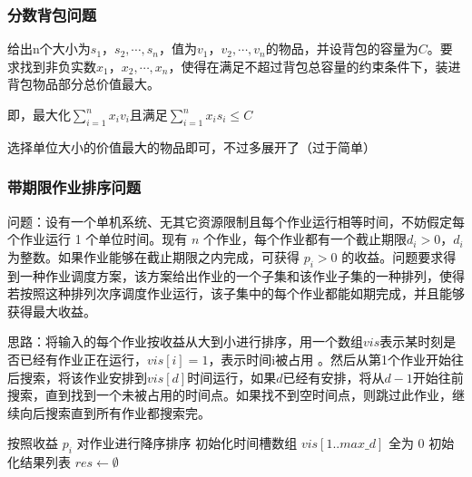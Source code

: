 \documentclass[./../main.tex]{subfiles}
\begin{document}
\subsubsection{分数背包问题}
给出n个大小为$s_{1}$，$s_{2},\cdots,s_{n}$，值为$v_{1}$，$v_{2},\cdots,v_{n}$的物品，并设背包的容量为$C$。要求找到非负实数$x_{1}$，$x_{2},\cdots,x_{n}$，使得在满足不超过背包总容量的约束条件下，装进背包物品部分总价值最大。

即，最大化$\sum_{i=1}^{n}x_{i}v_{i}$且满足$\sum_{i=1}^{n}x_{i}s_{i}\leq C$

选择单位大小的价值最大的物品即可，不过多展开了（过于简单）

\subsubsection{带期限作业排序问题}
问题：设有一个单机系统、无其它资源限制且每个作业运行相等时间，不妨假定每个作业运行 1 个单位时间。现有 $n$ 个作业，每个作业都有一个截止期限$d_i>0$，$d_i$ 为整数。如果作业能够在截止期限之内完成，可获得 $p_i>0$ 的收益。问题要求得到一种作业调度方案，该方案给出作业的一个子集和该作业子集的一种排列，使得若按照这种排列次序调度作业运行，该子集中的每个作业都能如期完成，并且能够获得最大收益。

思路：将输入的每个作业按收益从大到小进行排序，用一个数组$vis$表示某时刻是否已经有作业正在运行，$vis[i]=1$，表示时间i被占用 。然后从第1个作业开始往后搜索，将该作业安排到$vis[d]$时间运行，如果$d$已经有安排，将从$d-1$开始往前搜索，直到找到一个未被占用的时间点。如果找不到空时间点，则跳过此作业，继续向后搜索直到所有作业都搜索完。

\begin{algorithm}[H]
\caption{最大收益作业调度算法}

\BlankLine
按照收益 $p_i$ 对作业进行降序排序\; 
初始化时间槽数组 $vis[1..max\_d]$ 全为 $0$\;
初始化结果列表 $res \gets \emptyset$\;


\;
\end{algorithm}
\end{document}
